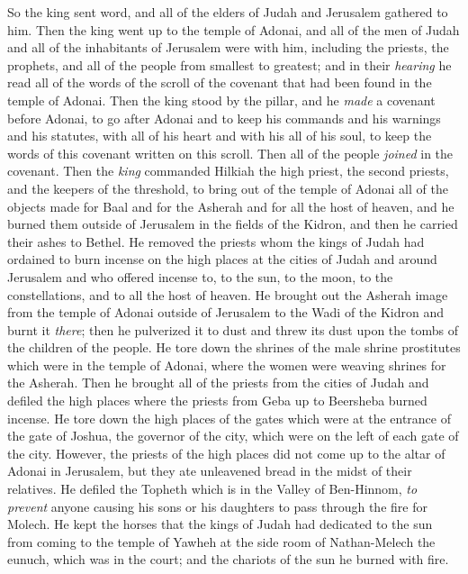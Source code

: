 \begin{biblechapter} %
 So the king sent word, and all of the elders of Judah and Jerusalem gathered to him.
\verse Then the king went up to the temple of Adonai, and all of the men of Judah and all of the inhabitants of Jerusalem were with him, including the priests, the prophets, and all of the people from smallest to greatest; and in their \textit{hearing} he read all of the words of the scroll of the covenant that had been found in the temple of Adonai.
\verse Then the king stood by the pillar, and he \textit{made} a covenant before Adonai, to go after Adonai and to keep his commands and his warnings and his statutes, with all of his heart and with his all of his soul, to keep the words of this covenant written on this scroll. Then all of the people \textit{joined} in the covenant.
\verse Then the \textit{king} commanded Hilkiah the high priest, the second priests, and the keepers of the threshold, to bring out of the temple of Adonai all of the objects made for Baal and for the Asherah and for all the host of heaven, and he burned them outside of Jerusalem in the fields of the Kidron, and then he carried their ashes to Bethel.
\verse He removed the priests whom the kings of Judah had ordained to burn incense on the high places at the cities of Judah and around Jerusalem and who offered incense to, to the sun, to the moon, to the constellations, and to all the host of heaven.
\verse He brought out the Asherah image from the temple of Adonai outside of Jerusalem to the Wadi of the Kidron and burnt it \textit{there}; then he pulverized it to dust and threw its dust upon the tombs of the children of the people.
\verse He tore down the shrines of the male shrine prostitutes which were in the temple of Adonai, where the women were weaving shrines for the Asherah.
\verse Then he brought all of the priests from the cities of Judah and defiled the high places where the priests from Geba up to Beersheba burned incense. He tore down the high places of the gates which were at the entrance of the gate of Joshua, the governor of the city, which were on the left of each gate of the city.
\verse However, the priests of the high places did not come up to the altar of Adonai in Jerusalem, but they ate unleavened bread in the midst of their relatives.
\verse He defiled the Topheth which is in the Valley of Ben-Hinnom, \textit{to prevent} anyone causing his sons or his daughters to pass through the fire for Molech.
\verse He kept the horses that the kings of Judah had dedicated to the sun from coming to the temple of Yawheh at the side room of Nathan-Melech the eunuch, which was in the court; and the chariots of the sun he burned with fire.

\end{biblechapter}

